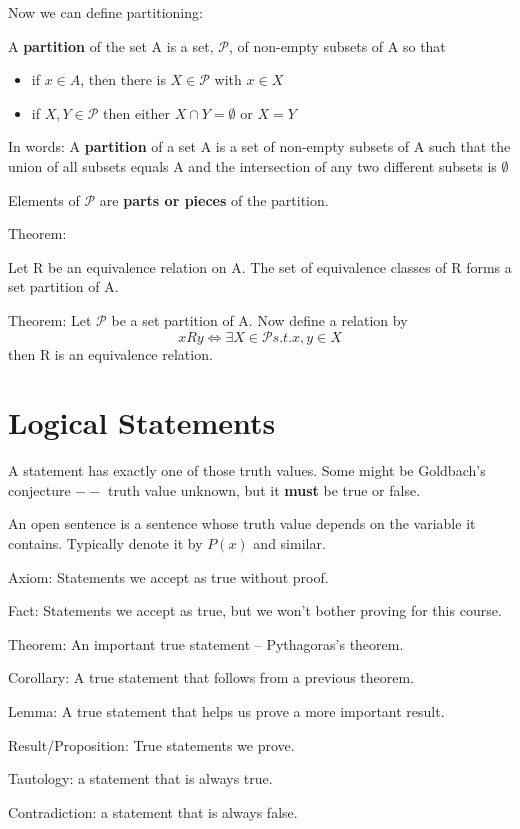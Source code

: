 \documentclass[letterpaper,12pt]{article}
\begin{document}
Now we can define partitioning:

A \textbf{partition} of the set A is a set, $\mathcal{P}$, of non-empty subsets of A so that 
\begin{itemize}
    \item if $x\in A$, then there is $X\in \mathcal{P}$ with $x\in X$
    \item if $X,Y\in \mathcal{P}$ then either $X\cap Y = \emptyset$ or $X=Y$
\end{itemize}
In words: A \textbf{partition} of a set A is a set of non-empty subsets of A such that the union of all subsets equals A and the intersection of any two different subsets is $\emptyset$

Elements of $\mathcal{P}$ are \textbf{parts or pieces} of the partition. 

Theorem:

Let R be an equivalence relation on A. The set of equivalence classes of R forms a set partition of A. 

Theorem: Let $\mathcal{P}$ be a set partition of A. Now define a relation by 
\[x R y \iff \exists X \in \mathcal{P} s.t. x,y \in X\]
then R is an equivalence relation. 



\section{Logical Statements}
A statement has exactly one of those truth values. Some might be Goldbach's conjecture $--$ truth value unknown, but it \textbf{must} be true or false.

An open sentence is a sentence whose truth value depends on the variable it contains. Typically denote it by $P(x)$ and similar. 

Axiom: Statements we accept as true without proof.

Fact: Statements we accept as true, but we won't bother proving for this course.

Theorem: An important true statement -- Pythagoras's theorem.

Corollary: A true statement that follows from a previous theorem.

Lemma: A true statement that helps us prove a more important result.

Result/Proposition: True statements we prove. 

Tautology: a statement that is always true.

Contradiction: a statement that is always false.
\end{document}
